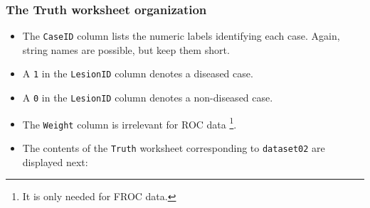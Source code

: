 \documentclass[]{book}
\providecommand{\tightlist}{%
  \setlength{\itemsep}{0pt}\setlength{\parskip}{0pt}}
\let\rmarkdownfootnote\footnote%
\def\footnote{\protect\rmarkdownfootnote}
\begin{document}
\hypertarget{the-truth-worksheet-organization}{%
\subsubsection{The Truth worksheet organization}\label{the-truth-worksheet-organization}}

\begin{itemize}
\tightlist
\item
  The \texttt{CaseID} column lists the numeric labels identifying each case. Again, string names are possible, but keep them short.
\item
  A \texttt{1} in the \texttt{LesionID} column denotes a diseased case.
\item
  A \texttt{0} in the \texttt{LesionID} column denotes a non-diseased case.
\item
  The \texttt{Weight} column is irrelevant for ROC data \footnote{It is only needed for FROC data.}.
\item
  The contents of the \texttt{Truth} worksheet corresponding to \texttt{dataset02} are displayed next:
\end{itemize}
\end{document}
